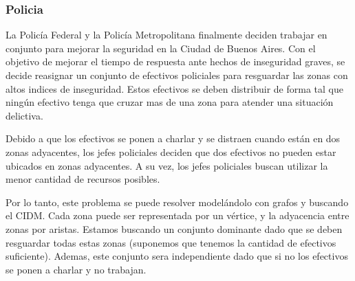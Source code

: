 \subsubsection{Policia}

La Policía Federal y la Policía Metropolitana finalmente deciden trabajar en conjunto para mejorar la seguridad en la Ciudad de Buenos Aires. Con el objetivo de mejorar el tiempo de respuesta ante hechos de inseguridad graves, se decide reasignar un conjunto de efectivos policiales para resguardar las zonas con altos indices de inseguridad. Estos efectivos se deben distribuir de forma tal que ningún efectivo tenga que cruzar mas de una zona para atender una situación delictiva.

Debido a que los efectivos se ponen a charlar y se distraen cuando están en dos zonas adyacentes, los jefes policiales deciden que dos efectivos no pueden estar ubicados en zonas adyacentes. A su vez, los jefes policiales buscan utilizar la menor cantidad de recursos posibles.

Por lo tanto, este problema se puede resolver modelándolo con grafos y buscando el CIDM. Cada zona puede ser representada por un vértice, y la adyacencia entre zonas por aristas. Estamos buscando un conjunto dominante dado que se deben resguardar todas estas zonas (suponemos que tenemos la cantidad de efectivos suficiente). Ademas, este conjunto sera independiente dado que si no los efectivos se ponen a charlar y no trabajan.